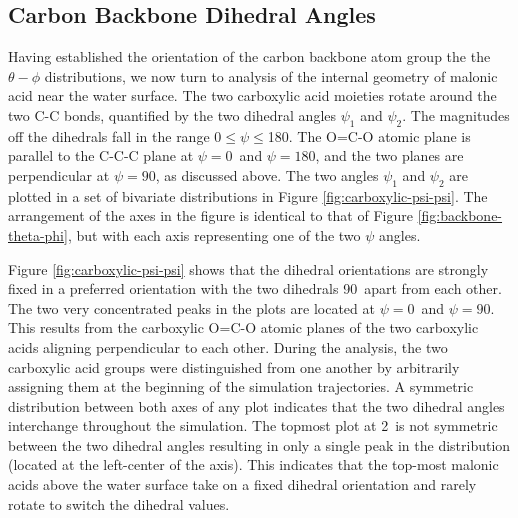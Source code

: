 \subsection {Carbon Backbone Dihedral Angles}

Having established the orientation of the carbon backbone atom group the the $\theta-\phi$ distributions, we now turn to analysis of the  internal geometry of malonic acid near the water surface. The two carboxylic acid moieties rotate around the two C-C bonds, quantified by the two dihedral angles $\psi_1$ and $\psi_2$. The magnitudes off the dihedrals fall in the range 0\textdegree$\le \psi \le$180\textdegree. The O=C-O atomic plane is parallel to the C-C-C plane at $\psi=0$\textdegree~and $\psi=180$\textdegree, and the two planes are perpendicular at $\psi=90$\textdegree, as discussed above. The two angles $\psi_1$ and $\psi_2$ are plotted in a set of bivariate distributions in Figure \ref{fig:carboxylic-psi-psi}. The arrangement of the axes in the figure is identical to that of Figure \ref{fig:backbone-theta-phi}, but with each axis representing one of the two $\psi$ angles.

Figure \ref{fig:carboxylic-psi-psi} shows that the dihedral orientations are strongly fixed in a preferred orientation with the two dihedrals 90\textdegree~apart from each other. The two very concentrated peaks in the plots are located at $\psi=0$\textdegree~and $\psi=90$\textdegree. This results from the carboxylic O=C-O atomic planes of the two carboxylic acids aligning perpendicular to each other. During the analysis, the two carboxylic acid groups were distinguished from one another by arbitrarily assigning them at the beginning of the simulation trajectories. A symmetric distribution between both axes of any plot indicates that the two dihedral angles interchange throughout the simulation. The topmost plot at 2\angs~is not symmetric between the two dihedral angles resulting in only a single peak in the distribution (located at the left-center of the axis). This indicates that the top-most malonic acids above the water surface take on a fixed dihedral orientation and rarely rotate to switch the dihedral values.


